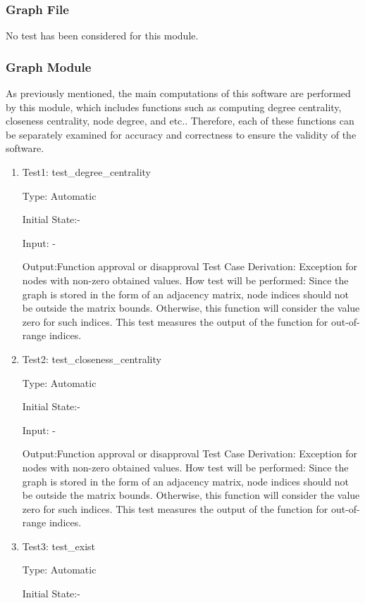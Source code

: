 \documentclass[12pt, titlepage]{article}
\begin{document}
\subsubsection{Graph File}
No test has been considered for this module.
\subsubsection{Graph Module}

As previously mentioned, the main computations of this software are performed by this module, which includes functions such as computing degree centrality, closeness centrality, node degree, and etc.. Therefore, each of these functions can be separately examined for accuracy and correctness to ensure the validity of the software.

\begin{enumerate}

\item{Test1: test\_degree\_centrality}

Type: Automatic
					
Initial State:-
					
Input: -
					
Output:Function approval or disapproval
Test Case Derivation: Exception for nodes with non-zero obtained values.
How test will be performed: Since the graph is stored in the form of an adjacency matrix, node indices should not be outside the matrix bounds. Otherwise, this function will consider the value zero for such indices. This test measures the output of the function for out-of-range indices.
					
\item{Test2: test\_closeness\_centrality}

Type: Automatic
					
Initial State:-
					
Input: -
					
Output:Function approval or disapproval
Test Case Derivation: Exception for nodes with non-zero obtained values.
How test will be performed: Since the graph is stored in the form of an adjacency matrix, node indices should not be outside the matrix bounds. Otherwise, this function will consider the value zero for such indices. This test measures the output of the function for out-of-range indices.
					

\item{Test3: test\_exist}

Type: Automatic
					
Initial State:-
					

\end{enumerate}
\end{document}
